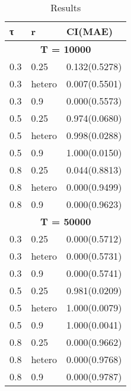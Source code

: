 \begin{table}[htbp]
\centering
\caption{Results}
\label{tab:combined}
\begin{tabular}{lll}
\toprule
τ & r & CI(MAE)\\
\midrule
\multicolumn{3}{c}{\textbf{T = 10000}} \\
\midrule
0.3 & 0.25 & 0.132(0.5278) \\
0.3 & hetero & 0.007(0.5501) \\
0.3 & 0.9 & 0.000(0.5573) \\
\hline
0.5 & 0.25 & 0.974(0.0680) \\
0.5 & hetero & 0.998(0.0288) \\
0.5 & 0.9 & 1.000(0.0150) \\
\hline
0.8 & 0.25 & 0.044(0.8813) \\
0.8 & hetero & 0.000(0.9499) \\
0.8 & 0.9 & 0.000(0.9623) \\
\hline
\multicolumn{3}{c}{\textbf{T = 50000}} \\
\midrule
0.3 & 0.25 & 0.000(0.5712) \\
0.3 & hetero & 0.000(0.5731) \\
0.3 & 0.9 & 0.000(0.5741) \\
\hline
0.5 & 0.25 & 0.981(0.0209) \\
0.5 & hetero & 1.000(0.0079) \\
0.5 & 0.9 & 1.000(0.0041) \\
\hline
0.8 & 0.25 & 0.000(0.9662) \\
0.8 & hetero & 0.000(0.9768) \\
0.8 & 0.9 & 0.000(0.9787) \\
\hline
\bottomrule
\end{tabular}
\end{table}